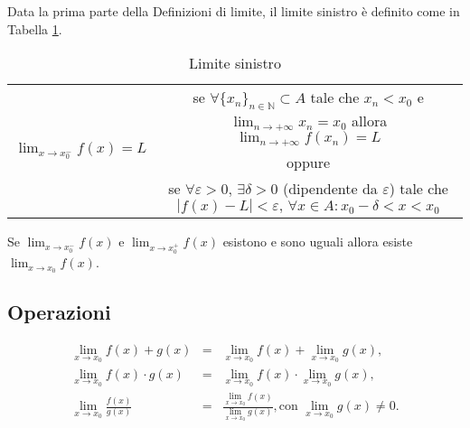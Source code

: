 \begin{definition}
    Data la prima parte della Definizioni di limite, il limite sinistro è definito come in Tabella \ref{tab:limite_sinistro}.

    \begin{table}[!hbt]
    \centering
    \begin{tabular}{|c|c|}
        \hline
        \multirow{3}{10em}{$\lim_{x\rightarrow x_0^-}f(x)=L$}& se $\forall\{x_n\}_{n\in\mathbb N}\subset A$ tale che $x_n<x_0$ e $\lim_{n\rightarrow+\infty}x_n=x_0$ allora $\lim_{n\rightarrow+\infty}f(x_n)=L$\\
        & oppure\\
        & se $\forall\varepsilon >0,\, \exists\delta>0$ (dipendente da $\varepsilon$) tale che $|f(x)-L|<\varepsilon,\,\forall x\in A\colon x_0-\delta<x<x_0$\\
        \hline
    \end{tabular}
    \caption{Limite sinistro}
    \label{tab:limite_sinistro}
    \end{table}
\end{definition}

\begin{proposition}\label{prop:esistenza_limite}
    Se $\lim_{x\rightarrow x_0^-}f(x)$ e $\lim_{x\rightarrow x_0^+}f(x)$ esistono e sono uguali allora esiste $\lim_{x\rightarrow x_0}f(x)$.
\end{proposition}

\subsection{Operazioni}

\begin{property}
    \begin{equation*}
        \begin{matrix}
        \lim_{x\rightarrow x_0}f(x)+g(x) &=& \lim_{x\rightarrow x_0}f(x)+\lim_{x\rightarrow x_0}g(x),\\
        \lim_{x\rightarrow x_0}f(x)\cdot g(x) &=& \lim_{x\rightarrow x_0}f(x)\cdot\lim_{x\rightarrow x_0}g(x),\\
        \lim_{x\rightarrow x_0}\frac{f(x)}{g(x)} &=& \frac{\lim_{x\rightarrow x_0}f(x)}{\lim_{x\rightarrow x_0}g(x)}, \text{con } \lim_{x\rightarrow x_0}g(x)\neq 0.
        \end{matrix}
    \end{equation*}
\end{property}

